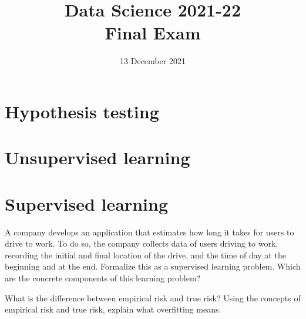 \documentclass[11pt]{article}
\title{
\vspace{-1.2cm}
Data Science 2021-22\\ Final Exam}
\author{13 December 2021}
\date{}%
\newcounter{marks}
\begin{document}
\maketitle


\section*{Hypothesis testing}
\begin{list}{{\bf Question 1.:}}
	{
	}

\item
{}
\addtocounter{marks}{2}

\item
{}
\addtocounter{marks}{2}

\item
{}
\addtocounter{marks}{2}


\end{list}

\pagebreak


\section*{Unsupervised learning}
\begin{list}{{\bf Question 2.:}}
	{
	}

\item
{}
\addtocounter{marks}{1}

\item
{}
\addtocounter{marks}{1}

\end{list}

\section*{Supervised learning}
\begin{list}{{\bf Question 3.:}}
	{
	}

\item
{}
\addtocounter{marks}{1}
A company develops an application that estimates how long it takes for users to drive to work. To do so, the company collects data of users driving to work, recording the initial and final location of the drive, and the time of day at the beginning and at the end. Formalize this as a supervised learning problem. Which are the concrete components of this learning problem?

\item
{}
\addtocounter{marks}{1}
What is the difference between empirical risk and true risk? Using the concepts of empirical risk and true risk, explain what overfitting means.

\end{list}
\end{document}
